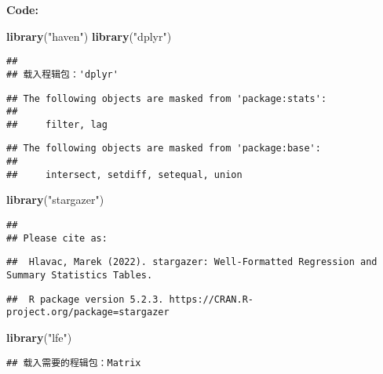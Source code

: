 \documentclass[
]{article}
\newenvironment{Shaded}{\begin{snugshade}}{\end{snugshade}}
\newcommand{\FunctionTok}[1]{\textcolor[rgb]{0.13,0.29,0.53}{\textbf{#1}}}
\newcommand{\NormalTok}[1]{#1}
\newcommand{\StringTok}[1]{\textcolor[rgb]{0.31,0.60,0.02}{#1}}
\begin{document}
\textbf{Code:}

\begin{Shaded}
\begin{Highlighting}[]
\FunctionTok{library}\NormalTok{(}\StringTok{"haven"}\NormalTok{)}
\FunctionTok{library}\NormalTok{(}\StringTok{"dplyr"}\NormalTok{)}
\end{Highlighting}
\end{Shaded}

\begin{verbatim}
## 
## 载入程辑包：'dplyr'
\end{verbatim}

\begin{verbatim}
## The following objects are masked from 'package:stats':
## 
##     filter, lag
\end{verbatim}

\begin{verbatim}
## The following objects are masked from 'package:base':
## 
##     intersect, setdiff, setequal, union
\end{verbatim}

\begin{Shaded}
\begin{Highlighting}[]
\FunctionTok{library}\NormalTok{(}\StringTok{"stargazer"}\NormalTok{)}
\end{Highlighting}
\end{Shaded}

\begin{verbatim}
## 
## Please cite as:
\end{verbatim}

\begin{verbatim}
##  Hlavac, Marek (2022). stargazer: Well-Formatted Regression and Summary Statistics Tables.
\end{verbatim}

\begin{verbatim}
##  R package version 5.2.3. https://CRAN.R-project.org/package=stargazer
\end{verbatim}

\begin{Shaded}
\begin{Highlighting}[]
\FunctionTok{library}\NormalTok{(}\StringTok{"lfe"}\NormalTok{)}
\end{Highlighting}
\end{Shaded}

\begin{verbatim}
## 载入需要的程辑包：Matrix
\end{verbatim}
\end{document}
